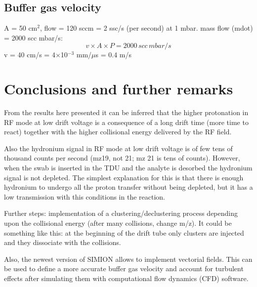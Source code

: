 \subsection{Buffer gas velocity}
A = 50 cm$^{2}$, flow = 120 sccm = 2 ssc/s (per second) at 1 mbar. mass flow (mdot) = 2000 scc  mbar/s:
\begin{equation}
v \times A \times P = 2000\, scc \, mbar / s
\end{equation}
v = 40 cm/s = 4$\times$10$^{-3}$ mm/$\mu$s = 0.4 m/s

\newpage
\section{Conclusions and further remarks}
From the results here presented it can be inferred that the higher protonation in RF mode at low drift voltage is a consequence of a long drift time (more time to react) together with the higher collisional energy delivered by the RF field.

Also the hydronium signal in RF mode at low drift voltage is of few tens of thousand counts per second (mz19, not 21; mz 21 is tens of counts). However, when the swab is inserted in the TDU and the analyte is desorbed the hydronium signal is not depleted. The simplest explanation for this is that there is enough hydronium to undergo all the proton transfer without being depleted, but it has a low transmission with this conditions in the reaction.


Further steps: implementation of a clustering/declustering process depending upon the collisional energy (after many collisions, change m/z). It could be something like this: at the beginning of the drift tube only clusters are injected and they dissociate with the collisions. 

Also, the newest version of SIMION allows to implement vectorial fields. This can be used to define a more accurate buffer gas velocity and account for turbulent effects after simulating them with computational flow dynamics (CFD) software.























